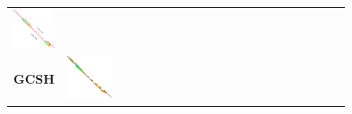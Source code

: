 \begin{figure}[t]
\begin{tabular}{l>{\centering}m{0.18\linewidth}>{\centering}m{0.18\linewidth}>{\centering}m{0.18\linewidth}>{\centering\arraybackslash}m{0.35\linewidth}}
    \includegraphics[scale=0.15]{imgs/comparison/csh-dt.png} \\[1cm]
    \textbf{GCSH} &
    \includegraphics[scale=0.15]{imgs/comparison/gcsh-noprune.png} &

\end{tabular}
\end{figure}
